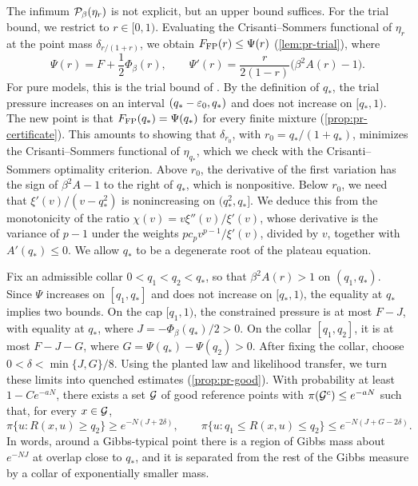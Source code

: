 The infimum $\mathcal P_\beta(\eta_r)$ is not explicit, but an upper bound suffices. For the trial bound, we restrict to $r\in[0,1)$. Evaluating the Crisanti--Sommers functional of $\eta_r$ at the point mass $\delta_{r/(1+r)}$, we obtain $F_{\rm FP}(r)\le\Psi(r)$ (\cref{lem:pr-trial}), where
\begin{equation}\label{eq:ov-trial}
\Psi(r)=F+\frac12\Phi_\beta(r),\qquad\Psi'(r)=\frac r{2(1-r)}\bigl(\beta^2A(r)-1\bigr).
\end{equation}
For pure models, this is the trial bound of \cite[Proposition~3.9]{ElAlaouiMontanariSellke2025}. By the definition of $q_*$, the trial pressure increases on an interval $(q_*-\varepsilon_0,q_*)$ and does not increase on $[q_*,1)$. The new point is that $F_{\rm FP}(q_*)=\Psi(q_*)$ for every finite mixture (\cref{prop:pr-certificate}). This amounts to showing that $\delta_{r_0}$, with $r_0=q_*/(1+q_*)$, minimizes the Crisanti--Sommers functional of $\eta_{q_*}$, which we check with the Crisanti--Sommers optimality criterion. Above $r_0$, the derivative of the first variation has the sign of $\beta^2A-1$ to the right of $q_*$, which is nonpositive. Below $r_0$, we need that $\xi'(v)/(v-q_*^2)$ is nonincreasing on $(q_*^2,q_*]$. We deduce this from the monotonicity of the ratio $\chi(v)=v\xi''(v)/\xi'(v)$, whose derivative is the variance of $p-1$ under the weights $pc_pv^{p-1}/\xi'(v)$, divided by $v$, together with $A'(q_*)\le0$. We allow $q_*$ to be a degenerate root of the plateau equation.

Fix an admissible collar $0<q_1<q_2<q_*$, so that $\beta^2A(r)>1$ on $(q_1,q_*)$. Since $\Psi$ increases on $[q_1,q_*]$ and does not increase on $[q_*,1)$, the equality at $q_*$ implies two bounds. On the cap $[q_1,1)$, the constrained pressure is at most $F-J$, with equality at $q_*$, where $J=-\Phi_\beta(q_*)/2>0$. On the collar $[q_1,q_2]$, it is at most $F-J-G$, where $G=\Psi(q_*)-\Psi(q_2)>0$. After fixing the collar, choose $0<\delta<\min\{J,G\}/8$. Using the planted law and likelihood transfer, we turn these limits into quenched estimates (\cref{prop:pr-good}). With probability at least $1-Ce^{-aN}$, there exists a set $\mathcal G$ of good reference points with $\pi(\mathcal G^c)\le e^{-aN}$ such that, for every $x\in\mathcal G$,
\begin{equation}\label{eq:ov-good}
\pi\{u:R(x,u)\ge q_2\}\ge e^{-N(J+2\delta)},\qquad\pi\{u:q_1\le R(x,u)\le q_2\}\le e^{-N(J+G-2\delta)}.
\end{equation}
In words, around a Gibbs-typical point there is a region of Gibbs mass about $e^{-NJ}$ at overlap close to $q_*$, and it is separated from the rest of the Gibbs measure by a collar of exponentially smaller mass.

